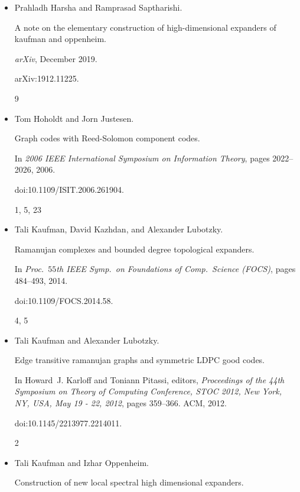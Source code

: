 \documentclass[10pt,a4paper]{article}
\begin{document}
\begin{itemize}
\item[] 
[15]

Prahladh Harsha and Ramprasad Saptharishi.


A note on the elementary construction of high-dimensional expanders
of kaufman and oppenheim.


\emph{arXiv}, December 2019.


arXiv:1912.11225.


9




\item[] 
[16]

Tom Hoholdt and Jorn Justesen.


Graph codes with Reed-Solomon component codes.


In \emph{2006 IEEE International Symposium on Information Theory},
pages 2022–2026, 2006.


doi:10.1109/ISIT.2006.261904.


1, 5, 23




\item[] 
[17]

Tali Kaufman, David Kazhdan, and Alexander Lubotzky.


Ramanujan complexes and bounded degree topological expanders.


In \emph{Proc. $55$th IEEE Symp. on Foundations of Comp. Science
(FOCS)}, pages 484–493, 2014.


doi:10.1109/FOCS.2014.58.


4, 5




\item[] 
[18]

Tali Kaufman and Alexander Lubotzky.


Edge transitive ramanujan graphs and symmetric LDPC good codes.


In Howard J. Karloff and Toniann Pitassi, editors, \emph{Proceedings
of the 44th Symposium on Theory of Computing Conference, STOC 2012, New
York, NY, USA, May 19 - 22, 2012}, pages 359–366. ACM, 2012.


doi:10.1145/2213977.2214011.


2




\item[] 
[19]

Tali Kaufman and Izhar Oppenheim.


Construction of new local spectral high dimensional expanders.



\end{itemize}
\end{document}
